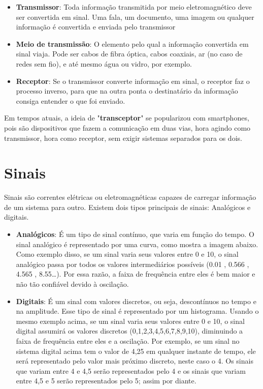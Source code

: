 \documentclass[12pt,a4, oneside, brazil]{article}
\begin{document}
	\begin{itemize}
		\item \textbf{Transmissor}: Toda informação transmitida por meio eletromagnético deve ser convertida em sinal. Uma fala, um documento, uma imagem ou qualquer informação é convertida e enviada pelo transmissor
		\item \textbf{Meio de transmissão}: O elemento pelo qual a informação convertida em sinal viaja. Pode ser cabos de fibra óptica, cabos coaxiais, ar (no caso de redes sem fio), e até mesmo água ou vidro, por exemplo.
		\item \textbf{Receptor}: Se o transmissor converte informação em sinal, o receptor faz o processo inverso, para que na outra ponta o destinatário da informação consiga entender o que foi enviado.
	\end{itemize}

Em tempos atuais, a ideia de "\textbf{transceptor}" se popularizou com smartphones, pois são dispositivos que fazem a comunicação em duas vias, hora agindo como transmissor, hora como receptor, sem exigir sistemas separados para os dois.


	\section{Sinais}
	Sinais são correntes elétricas ou eletromagnéticas capazes de carregar informação de um sistema para outro. Existem dois tipos principais de sinais: Analógicos e digitais.
	
	\begin{itemize}
		\item \textbf{Analógicos}: É um tipo de sinal contínuo, que varia em função do tempo. O sinal analógico é representado por uma curva, como mostra a imagem abaixo. Como exemplo disso, se um sinal varia seus valores entre 0 e 10, o sinal analógico passa por todos os valores intermediários possíveis (0.01 , 0.566 , 4.565 , 8.55…). Por essa razão, a faixa de frequência entre eles é bem maior e não tão confiável devido à oscilação.

		\item \textbf{Digitais}: É um sinal com valores discretos, ou seja, descontínuos no tempo e na amplitude. Esse tipo de sinal é representado por um histograma. Usando o mesmo exemplo acima, se um sinal varia seus valores entre 0 e 10, o sinal digital assumirá os valores discretos (0,1,2,3,4,5,6,7,8,9,10), diminuindo a faixa de frequência entre eles e a oscilação. Por exemplo, se um sinal no sistema digital acima tem o valor de 4,25 em qualquer instante de tempo, ele será representado pelo valor mais próximo discreto, neste caso o 4. Os sinais que variam entre 4 e 4,5 serão representados pelo 4 e os sinais que variam entre 4,5 e 5 serão representados pelo 5; assim por diante.
		
	\end{itemize}
\end{document}
